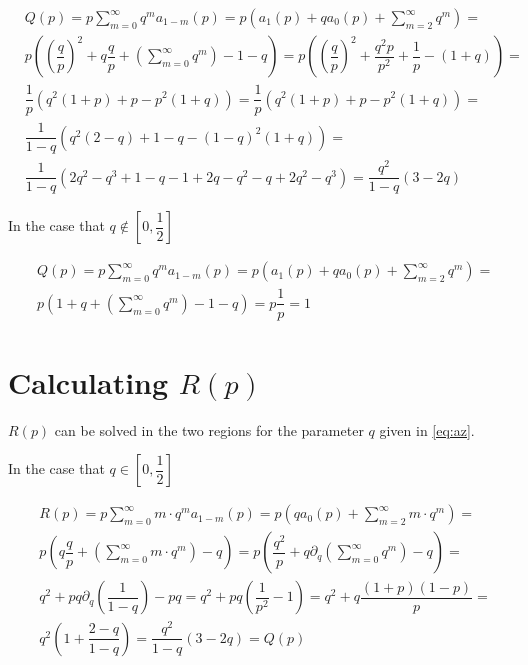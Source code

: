 \documentclass[letterpaper,12pt]{report}
\theoremstyle{plain}
\theoremstyle{definition}
\begin{document}
\begin{eqnarray}\label{eq:rpcalc}\nonumber
&\mathit{Q}(p)=p\sum_{m=0}^{\infty}q^m\mathit{a}_{1-m}(p)=p\left(
\mathit{a}_1(p)+q\mathit{a}_0(p)+\sum_{m=2}^{\infty}q^m
 \right)=\\\nonumber
 &p\left(
\left(\dfrac{q}{p}\right)^2+q\dfrac{q}{p}+\left(\sum_{m=0}^{\infty}q^m\right)-1-q
 \right) 
 =p\left(
\left(\dfrac{q}{p}\right)^2+\dfrac{q^2p}{p^2}+\dfrac{1}{p}-(1+q)
 \right)=\\\nonumber
&\dfrac{1}{p}\left(
q^2(1+p)+p-p^2(1+q)
\right) 
 =\dfrac{1}{p}
\left(q^2(1+p)+p-p^2(1+q)
 \right)=\\\nonumber
&\dfrac{1}{1-q}\left(
q^2(2-q)+1-q-(1-q)^2(1+q)
\right) 
 =\\\nonumber
 &\dfrac{1}{1-q}\left(
2q^2-q^3+1-q-1+2q-q^2 -q+2q^2-q^3
\right) = \dfrac{q^2}{1-q}\left(
3-2q
\right)
\end{eqnarray}

In the case  that $q\notin [0,\dfrac{1}{2}]$

\begin{eqnarray}\nonumber
&\mathit{Q}(p)=p\sum_{m=0}^{\infty}q^m\mathit{a}_{1-m}(p)=p\left(
\mathit{a}_1(p)+q\mathit{a}_0(p)+\sum_{m=2}^{\infty}q^m
 \right)=\\\nonumber
 &p
\left(1+q+\left(\sum_{m=0}^{\infty}q^m\right)-1-q
 \right) 
 =p\dfrac{1}{p}=1
\end{eqnarray}

\section{Calculating $\mathit{R}(p)$ } \label{app:calcrofp}  

$\mathit{R}(p)$  can be solved in the two regions for the parameter $q$ given in \ref{eq:az}.

In the case  that $q\in [0,\dfrac{1}{2}]$

\begin{eqnarray}\label{eq:rpcalc}\nonumber
&\mathit{R}(p)=p\sum_{m=0}^{\infty}m\cdot q^m\mathit{a}_{1-m}(p)=p\left(
q\mathit{a}_0(p)+\sum_{m=2}^{\infty}m\cdot q^m
 \right)=\\\nonumber
 &p\left(
q\dfrac{q}{p}+\left(\sum_{m=0}^{\infty}m\cdot q^m\right)-q
 \right) 
 =p\left(
\dfrac{q^2}{p}+q\partial_q\left(\sum_{m=0}^{\infty} q^m\right)-q
 \right)=\\\nonumber
& q^2+pq\partial_q\left(\dfrac{1}{1-q}\right)-pq 
 = q^2+pq\left(\dfrac{1}{p^2} -1\right) =q^2+q\dfrac{(1+p)(1-p)}{p}=
 \\\nonumber
& q^2\left(1+\dfrac{2-q}{1-q}\right)= \dfrac{q^2}{1-q}\left(
3-2q\right)=\mathit{Q}(p)
\end{eqnarray}
\end{document}
